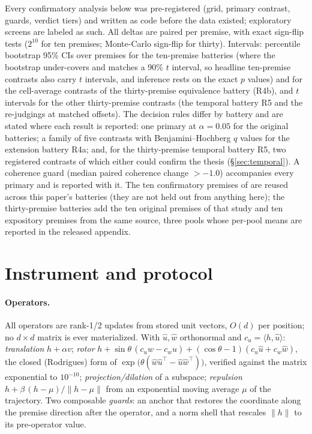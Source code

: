 \documentclass[11pt]{article}
\begin{document}
Every confirmatory analysis below was pre-registered (grid, primary
contrast, guards, verdict tiers) and written as code before the data
existed; exploratory screens are labeled as such. All deltas are paired
per premise, with exact sign-flip tests ($2^{10}$ for ten premises;
Monte-Carlo sign-flip for thirty). Intervals: percentile bootstrap 95\%
CIs over premises for the ten-premise batteries (where the bootstrap
under-covers and matches a 90\% $t$ interval, so headline ten-premise
contrasts also carry $t$ intervals, and inference rests on the exact $p$
values) and for the cell-average contrasts of the thirty-premise
equivalence battery (R4b), and $t$ intervals for the other thirty-premise
contrasts (the temporal battery R5 and the re-judgings at matched
offsets). The decision
rules differ by battery and are stated where each result is reported:
one primary at $\alpha=0.05$ for the original batteries; a family of
five contrasts with Benjamini--Hochberg $q$ values for the extension
battery R4a; and, for the thirty-premise temporal battery R5, two
registered contrasts of which either could confirm the thesis
(\S\ref{sec:temporal}). A coherence guard (median paired coherence
change $> -1.0$) accompanies every primary and is reported with it. The
ten confirmatory premises of \citet{ono2026interrupting} are reused
across this paper's batteries (they are not held out from anything
here); the thirty-premise batteries add the ten original premises of
that study and ten expository premises from the same source, three pools
whose per-pool means are reported in the released appendix.

\section{Instrument and protocol}
\label{sec:instrument}

\paragraph{Operators.} All operators are rank-1/2 updates from stored
unit vectors, $O(d)$ per position; no $d\times d$ matrix is ever
materialized. With $\hat u,\hat w$ orthonormal and
$c_u=\langle h,\hat u\rangle$: \emph{translation} $h + \alpha v$;
\emph{rotor} $h + \sin\theta\,(c_u \hat w - c_w \hat u) +
(\cos\theta-1)(c_u \hat u + c_w \hat w)$, the closed (Rodrigues) form of
$\exp\!\big(\theta(\hat w\hat u^{\top}-\hat u\hat w^{\top})\big)$,
verified against the matrix exponential to $10^{-10}$;
\emph{projection/dilation} of a subspace; \emph{repulsion}
$h + \beta\,(h-\mu)/\lVert h-\mu\rVert$ from an exponential moving
average $\mu$ of the trajectory. Two composable \emph{guards}: an
anchor that restores the coordinate along the premise direction after
the operator, and a norm shell that rescales $\lVert h\rVert$ to its
pre-operator value.
\end{document}

